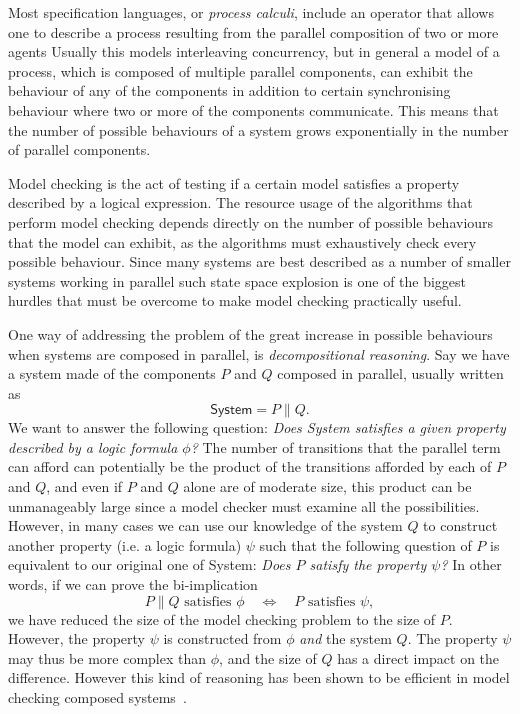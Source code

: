 Most specification languages, or \emph{process calculi}, 
include an operator that allows one to describe a process resulting from the 
parallel composition of two or more agents
Usually this models interleaving
concurrency, but in general a model of a process, which is composed of multiple
parallel components, can exhibit the behaviour of any of the components in addition
to certain synchronising behaviour where two or more of the components communicate.
This means that the number of possible behaviours of a system grows exponentially
in the number of parallel components.

Model checking is the act of testing if a certain model satisfies a property
described by a logical expression. The resource usage of the algorithms that perform
model checking depends directly on the number of possible behaviours that the
model can exhibit, as the algorithms must exhaustively check every possible
behaviour. Since many systems are best described as a number of smaller systems
working in parallel such state space explosion is one of the biggest hurdles that
must be overcome to make model checking practically useful.

One way of addressing the problem of the great increase in possible behaviours
when systems are composed in parallel, is \emph{decompositional reasoning}. Say
we have a system made of the components $P$ and $Q$ composed in parallel, 
usually written as
\[
    \textsf{System} = P \parallel Q.
\]
We want to answer the following question: 
\emph{Does \textsf{System} satisfies a given property described by a
logic formula $\phi$?} 
The number of transitions that the parallel term can afford
can potentially be the product of the transitions afforded by each of $P$ and $Q$,
and even if $P$ and $Q$ alone are of moderate size, this product can be unmanageably 
large since a model checker must examine all the possibilities.
However, in many cases we can use our knowledge of the system $Q$ to construct
another property (i.e. a logic formula) $\psi$ such that the following question
of $P$
is equivalent to our original one of \textsf{System}:
\emph{Does $P$ satisfy the property $\psi$?} In other words, if we can prove the
bi-implication
\[
    P\parallel Q \textrm{ satisfies } \phi \quad\Leftrightarrow\quad
    P \textrm{ satisfies } \psi,
\]
we have reduced the size of the model checking problem to the size of $P$.
%
However, the property $\psi$ is constructed from $\phi$ \emph{and} the system $Q$.
The property $\psi$ may thus be more complex than $\phi$, and the size of $Q$ has
a direct impact on the difference. However this kind of reasoning has been shown
to be efficient in model checking composed systems~\cite{Andersen95,LaroussinieL98}.

